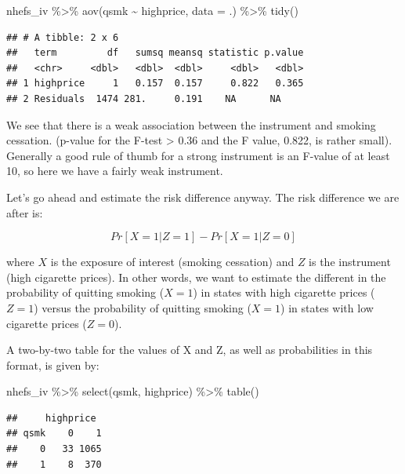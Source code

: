 \documentclass[
]{book}
\newenvironment{Shaded}{\begin{snugshade}}{\end{snugshade}}
\newcommand{\AttributeTok}[1]{\textcolor[rgb]{0.77,0.63,0.00}{#1}}
\newcommand{\FunctionTok}[1]{\textcolor[rgb]{0.00,0.00,0.00}{#1}}
\newcommand{\NormalTok}[1]{#1}
\newcommand{\SpecialCharTok}[1]{\textcolor[rgb]{0.00,0.00,0.00}{#1}}
\begin{document}
\begin{Shaded}
\begin{Highlighting}[]
\NormalTok{nhefs\_iv }\SpecialCharTok{\%\textgreater{}\%} 
  \FunctionTok{aov}\NormalTok{(qsmk }\SpecialCharTok{\textasciitilde{}}\NormalTok{ highprice, }\AttributeTok{data =}\NormalTok{ .) }\SpecialCharTok{\%\textgreater{}\%} 
  \FunctionTok{tidy}\NormalTok{()}
\end{Highlighting}
\end{Shaded}

\begin{verbatim}
## # A tibble: 2 x 6
##   term         df   sumsq meansq statistic p.value
##   <chr>     <dbl>   <dbl>  <dbl>     <dbl>   <dbl>
## 1 highprice     1   0.157  0.157     0.822   0.365
## 2 Residuals  1474 281.     0.191    NA      NA
\end{verbatim}

We see that there is a weak association between the instrument and smoking cessation. (p-value for the F-test \textgreater{} 0.36 and the F value, 0.822, is rather small). Generally a good rule of thumb for a strong instrument is an F-value of at least 10, so here we have a fairly weak instrument.

Let's go ahead and estimate the risk difference anyway. The risk difference we are after is:

\[
Pr[X=1|Z=1] -  Pr[X=1|Z=0]
\]

where \(X\) is the exposure of interest (smoking cessation) and \(Z\) is the instrument (high cigarette prices). In other words, we want to estimate the different in the probability of quitting smoking (\(X = 1\)) in states with high cigarette prices (\(Z = 1\)) versus the probability of quitting smoking (\(X = 1\)) in states with low cigarette prices (\(Z = 0\)).

A two-by-two table for the values of X and Z, as well as probabilities in this format, is given by:

\begin{Shaded}
\begin{Highlighting}[]
\NormalTok{nhefs\_iv }\SpecialCharTok{\%\textgreater{}\%} 
  \FunctionTok{select}\NormalTok{(qsmk, highprice) }\SpecialCharTok{\%\textgreater{}\%} 
  \FunctionTok{table}\NormalTok{()}
\end{Highlighting}
\end{Shaded}

\begin{verbatim}
##     highprice
## qsmk    0    1
##    0   33 1065
##    1    8  370
\end{verbatim}
\end{document}

